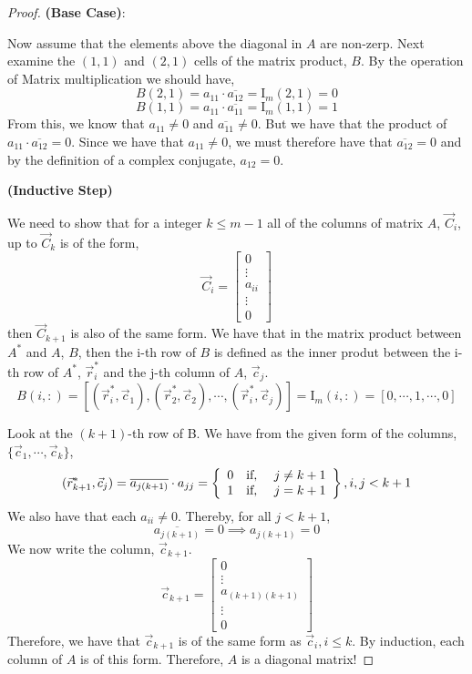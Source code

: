 \documentclass{article}
\begin{document}
\begin{enumerate}
\begin{proof}
\textbf{(Base Case)}: 

Now assume that the elements above the diagonal in $A$ are non-zerp. Next examine the $(1, 1)$ and $(2, 1)$ cells of the matrix product, $B$. By the operation of Matrix multiplication we should have, 
\[
    B(2, 1) = a_{11} \cdot \overline{a_{12}} = \mathrm{I}_m(2, 1) = 0
\]
\[
    B(1, 1) = a_{11} \cdot \overline{a_{11}} = \mathrm{I}_m(1, 1) = 1
\]
From this, we know that $a_{11} \neq 0$ and $\overline{a_{11}} \neq 0$. But we have that the product of $a_{11} \cdot \overline{a_{12}} = 0$. Since we have that  $a_{11} \neq 0$, we must therefore have that $\overline{a_{12}} = 0$ and by the definition of a complex conjugate, $a_{12} = 0$. 

\textbf{(Inductive Step)}

We need to show that for a integer $k \le m-1$ all of the columns of matrix $A$, $\vec{C}_i$, up to $\vec{C}_k$ is of the form, 
\[
    \vec{C}_i = \left[\begin{array}{c}
                0 \\
                \vdots \\
                a_{ii} \\
                \vdots \\
                0
                \end{array}\right]
\]
then $\vec{C}_{k+1}$ is also of the same form. We have that in the matrix product between $A^*$ and $A$, $B$, then the i-th row of $B$ is defined as the inner produt between the i-th row of $A^*$, $\vec{r}_i^*$ and the j-th column of $A$, $\vec{c}_j$.  
\[
    B(i, :) = [(\vec{r}_i^*, \vec{c}_1), (\vec{r}_2^*, \vec{c}_2), \cdots, (\vec{r}_i^*, \vec{c}_j)] = \mathrm{I}_m(i, :) = [0, \cdots, 1, \cdots, 0]
\]

Look at the $(k+1)$-th row of B. We have from the given form of the columns, $\{\vec{c}_1, \cdots, \vec{c}_k\}$, 
\[
    (\vec{r}_{k+1}^*, \vec{c}_j) = \overline{a_{j(k+1)}}\cdot a_{jj} = \left\{\begin{array}{c c c}
                                                                0 & \text{if, } & j \neq k+1\\
                                                                1 & \text{if, } & j = k+1
                                                            \end{array}\right\}, i, j < k+1
\]
We also have that each $a_{ii} \neq 0$. Thereby, for all $j < k+1$, 
\[\overline{a_{j(k+1)}} = 0 \implies a_{j(k+1)} = 0\]We now write the column, $\vec{c}_{k+1}$. 
\[  
    \vec{c}_{k+1} = \left[\begin{array}{c}
                    0 \\
                    \vdots \\
                    a_{(k+1)(k+1)} \\
                    \vdots \\
                    0
                    \end{array}\right]
\]
Therefore, we have that $\vec{c}_{k+1}$ is of the same form as $\vec{c}_{i}, i \le k$. By induction, each column of $A$ is of this form. Therefore, $A$ is a diagonal matrix!



\end{proof}
\end{enumerate}
\end{document}
